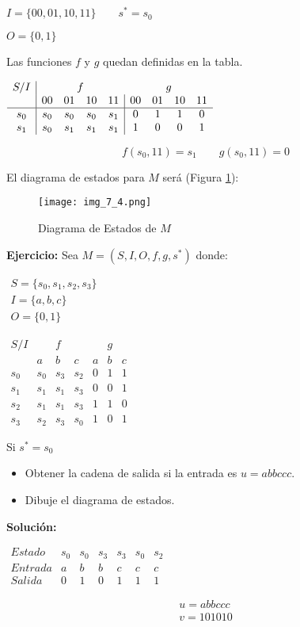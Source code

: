 $I=\{00,01,10,11\} \qquad s^*=s_0$

$O=\{0,1\}$

Las funciones $f$ y $g$ quedan definidas en la tabla.

\begin{center}
$\begin{array}{c|cccc|cccc}
S/I	&\multicolumn{4}{c}{f}	&\multicolumn{4}{c}{g}\\
	&00	&01	&10	&11	&00	&01	&10	&11	\\ \hline
s_0	&s_0&s_0&s_0&s_1&0	&1	&1	&0	\\
s_1	&s_0&s_1&s_1&s_1&1	&0	&0	&1
\end{array}$
\end{center}

$$f(s_0,11)=s_1 \qquad g(s_0,11)=0$$

El diagrama de estados para $M$ será (Figura \ref{fig7_4}):

\begin{figure}[h]
\centering
\texttt{[image: img\_7\_4.png]} 
\caption{Diagrama de Estados de $M$}\label{fig7_4}
\end{figure}

\textbf{Ejercicio: }Sea $M=(S,I,O,f,g,s^*)$ donde:

$\begin{array}{l}
S=\{s_0,s_1,s_2,s_3\}\\
I=\{a,b,c\} \\
O=\{0,1\}
\end{array}$
\begin{center}
$\begin{array}{c|ccc|ccc}
S/I	&	&f	&	&	&g	&	\\
	&a	&b	&c	&a	&b	&c	\\ \hline
s_0	&s_0&s_3&s_2&0	&1	&1	\\
s_1	&s_1&s_1&s_3&0	&0	&1	\\
s_2	&s_1&s_1&s_3&1	&1	&0	\\
s_3	&s_2&s_3&s_0&1	&0	&1
\end{array}$
\end{center}
Si $s^*=s_0$

\begin{itemize}
\item Obtener la cadena de salida si la entrada es $u=abbccc$.
\item Dibuje el diagrama de estados.
\end{itemize}

\textbf{Solución: }
\begin{center}
$\begin{array}{c|c|c|c|c|c|c}
Estado &s_0	&s_0	&s_3	&s_3	&s_0	&s_2	\\ \hline
Entrada	&a	&b	&b	&c	&c	&c	\\ \hline
Salida	&0	&1	&0	&1	&1	&1
\end{array}$
\end{center}
\begin{align*}
u=abbccc \\
v=101010
\end{align*}


